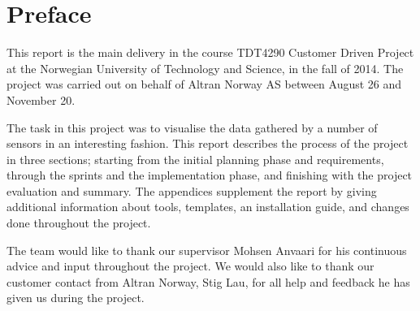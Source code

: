 \documentclass[../document.tex]{subfiles}
\begin{document}
\section*{Preface}
This report is the main delivery in the course TDT4290 Customer Driven Project at the Norwegian University of Technology and Science, in the fall of 2014. The project was carried out on behalf of Altran Norway AS between August 26 and November 20. 

The task in this project was to visualise the data gathered by a number of sensors in an interesting fashion. This report describes the process of the project in three sections; starting from the initial planning phase and requirements, through the sprints and the implementation phase, and finishing with the project evaluation and summary. The appendices supplement the report by giving additional information about tools, templates, an installation guide, and changes done throughout the project.

The team would like to thank our supervisor Mohsen Anvaari for his continuous advice and input throughout the project. We would also like to thank our customer contact from Altran Norway, Stig Lau, for all help and feedback he has given us during the project. 
\end{document}
